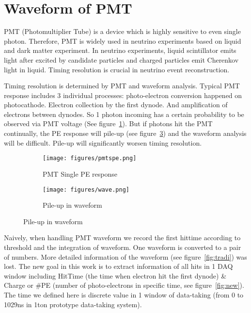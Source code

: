 \section{Waveform of PMT} %
PMT (Photomultiplier Tube) is a device which is highly sensitive to even single photon. Therefore, PMT is widely used in neutrino experiments based on liquid and dark matter experiment. In neutrino experiments, liquid scintillator emits light after excited by candidate particles and charged particles emit Cherenkov light in liquid. Timing resolution is crucial in neutrino event reconstruction. 

Timing resolution is determined by PMT and waveform analysis. Typical PMT response includes 3 individual processes: photo-electron conversion happened on photocathode. Electron collection by the first dynode. And amplification of electrons between dynodes. So 1 photon incoming has a certain probability to be observed via PMT voltage (See figure~\ref{fig:spe}). But if photons hit the PMT continually, the PE response will pile-up (see figure~\ref{fig:pile}) and the waveform analysis will be difficult. Pile-up will significantly worsen timing resolution. 

\begin{figure}[H]
\begin{minipage}{.5\textwidth}
\begin{figure}[H]
    \centering
    \texttt{[image: figures/pmtspe.png]}
    \caption{\label{fig:spe} PMT Single PE response}
\end{figure}
\end{minipage}
\begin{minipage}{.5\textwidth}
\begin{figure}[H]
    \centering
    \texttt{[image: figures/wave.png]}
    \caption{\label{fig:pile} Pile-up in waveform}
\end{figure}
\end{minipage}
\end{figure}

Naively, when handling PMT waveform we record the first hittime according to threshold and the integration of waveform. One waveform is converted to a pair of numbers. More detailed information of the waveform (see figure~\ref{fig:tradi}) was lost. The new goal in this work is to extract information of all hits in 1 DAQ window including HitTime (the time when electron hit the first dynode) \& Charge or \#PE (number of photo-electrons in specific time, see figure~\ref{fig:new}). The time we defined here is discrete value in 1 window of data-taking (from 0 to 1029ns in 1ton prototype data-taking system). 

